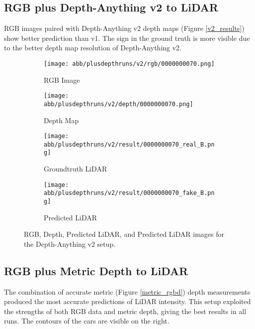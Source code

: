 \subsection{RGB plus Depth-Anything v2 to LiDAR}
RGB images paired with Depth-Anything v2 depth maps (Figure \ref{v2_results}) show better prediction than v1. The sign in the ground  truth is more visible due to the better depth map resolution of Depth-Anything v2.
\begin{figure}[!ht]
	\centering
	\begin{subfigure}{0.4\textwidth}
		\centering
		\texttt{[image: abb/plusdepthruns/v2/rgb/0000000070.png]}
		\caption{RGB Image}
		\label{fig:v2_rgb}
	\end{subfigure}
	
	\vspace{1em} %
	
	\begin{subfigure}{0.4\textwidth}
		\centering
		\texttt{[image: abb/plusdepthruns/v2/depth/0000000070.png]}
		\caption{Depth Map}
		\label{fig:v2_depth}
	\end{subfigure}
	
	\vspace{1em} %
	
	\begin{subfigure}{0.25\textwidth}
		\centering
		\texttt{[image: abb/plusdepthruns/v2/result/0000000070\_real\_B.png]}
		\caption{Groundtruth LiDAR}
		\label{fig:v2_pred_lidar}
	\end{subfigure}
	\begin{subfigure}{0.25\textwidth}
		\centering
		\texttt{[image: abb/plusdepthruns/v2/result/0000000070\_fake\_B.png]}
		\caption{Predicted LiDAR}
		\label{v2}
	\end{subfigure}
	
	\caption{RGB, Depth, Predicted LiDAR, and Predicted LiDAR images for the Depth-Anything v2 setup.}
	\label{v2_rgbd}
\end{figure}
\subsection{RGB plus Metric Depth to LiDAR}

The combination of accurate metric (Figure \ref{metric_rgbd}) depth measurements produced the most accurate predictions of LiDAR intensity. This setup exploited the strengths of both RGB data and metric depth, giving the best results in all runs. The contours of the cars are visible on the right. 

